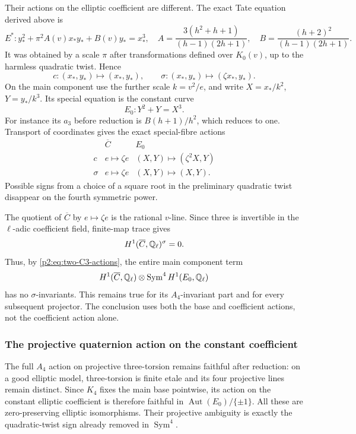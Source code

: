 Their actions on the elliptic coefficient are different.  The exact
Tate equation derived above is
\[
 E^*: y_*^2+\pi^2 A(v)x_*y_*+B(v)y_*=x_*^3,
\quad
 A=\frac{3(h^2+h+1)}{(h-1)(2h+1)},\quad
 B=\frac{(h+2)^2}{(h-1)(2h+1)}.
\]
It was obtained by a scale $\pi$ after transformations defined over
$K_0(v)$, up to the harmless quadratic twist.  Hence
\[
 c:(x_*,y_*)\mapsto(x_*,y_*),\qquad
 \sigma:(x_*,y_*)\mapsto(\zeta x_*,y_*).
\]
On the main component use the further scale $k=v^2/e$, and write
$X=x_*/k^2$, $Y=y_*/k^3$.  Its special equation is the constant curve
\[
 E_0:Y^2+Y=X^3.
\]
For instance its $a_3$ before reduction is
$B(h+1)/h^2$, which reduces to one.  Transport of coordinates gives
the exact special-fibre actions
\begin{equation}\label{p2:eq:two-C3-actions}
 \begin{array}{c|cc}
 &\overline C&E_0\\\hline
 c&e\mapsto\zeta e&(X,Y)\mapsto(\zeta^2X,Y)\\
 \sigma&e\mapsto\zeta e&(X,Y)\mapsto(X,Y).
 \end{array}
\end{equation}
Possible signs from a choice of a square root in the preliminary
quadratic twist disappear on the fourth symmetric power.

The quotient of $\overline C$ by $e\mapsto\zeta e$ is the rational
$v$-line.  Since three is invertible in the $\ell$-adic coefficient
field, finite-map trace gives
\[
 H^1(\overline C,\mathbb Q_\ell)^{\sigma}=0.
\]
Thus, by \eqref{p2:eq:two-C3-actions}, the entire main component term
\[
 H^1(\overline C,\mathbb Q_\ell)\otimes
       \operatorname{Sym}^4H^1(E_0,\mathbb Q_\ell)
\]
has no $\sigma$-invariants.  This remains true for its $A_4$-invariant
part and for every subsequent projector.  The conclusion uses both
the base and coefficient actions, not the coefficient action alone.

\subsubsection{The projective quaternion action on the constant coefficient}
The full $A_4$ action on projective three-torsion remains faithful
after reduction: on a good elliptic model, three-torsion is finite
etale and its four projective lines remain distinct.  Since $K_4$
fixes the main base pointwise, its action on the constant elliptic
coefficient is therefore faithful in $\operatorname{Aut}(E_0)/\{\pm1\}$.
All these are zero-preserving elliptic isomorphisms.  Their projective
ambiguity is exactly the quadratic-twist sign already removed in
$\operatorname{Sym}^4$.

